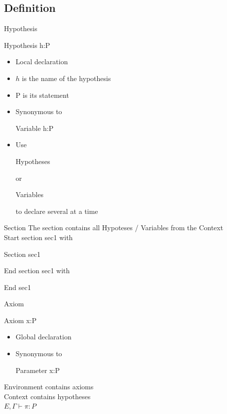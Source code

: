 \subsection{Definition}
\begin{frame}[fragile]{Hypothesis}
	\begin{user}
	Hypothesis h:P
	\end{user}
	\begin{itemize}
		\item Local declaration
		\pause
		\item $h$ is the name of the hypothesis
		\pause
		\item P is its statement
		\pause
		\item Synonymous to
		\begin{user}
		Variable h:P
		\end{user}
		\pause
		\item Use
		\begin{user}
		Hypotheses
		\end{user}
		or
		\begin{user}
		Variables
		\end{user}
		to declare several at a time
	\end{itemize}
\end{frame}
\begin{frame}[fragile]{Section}
	The section contains all Hypoteses / Variables from the Context\\
	\pause
	\medskip
	Start section sec1 with
	\begin{user}
	Section sec1
	\end{user}
	\pause
	\medskip
	End section sec1 with
	\begin{user}
	End sec1
	\end{user}
\end{frame}
\begin{frame}[fragile]{Axiom}
	\begin{user}
	Axiom x:P
	\end{user}
	\begin{itemize}
		\item Global declaration
		\pause
		\item Synonymous to
		\begin{user}
		Parameter x:P
		\end{user}
	\end{itemize}
	\pause
	\medskip
	Environment contains axioms\\
	\pause
	\medskip
	Context contains hypotheses\\
	\pause
	\medskip
	$E, \Gamma \vdash \pi : P$
\end{frame}
